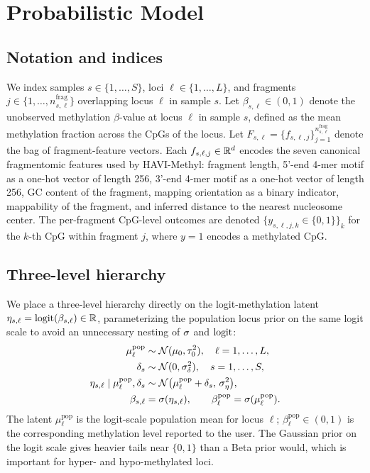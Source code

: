 \section{Probabilistic Model}
\label{sec:model}

\subsection{Notation and indices}
We index samples $s\in\{1,\dots,S\}$, loci $\ell\in\{1,\dots,L\}$, and fragments $j\in\{1,\dots,n^{\mathrm{frag}}_{s,\ell}\}$ overlapping locus $\ell$ in sample $s$. Let $\beta_{s,\ell}\in(0,1)$ denote the unobserved methylation $\beta$-value at locus $\ell$ in sample $s$, defined as the mean methylation fraction across the CpGs of the locus. Let $F_{s,\ell} = \{f_{s,\ell,j}\}_{j=1}^{n^{\mathrm{frag}}_{s,\ell}}$ denote the bag of fragment-feature vectors. Each $f_{s,\ell,j}\in\mathbb{R}^d$ encodes the seven canonical fragmentomic features used by HAVI-Methyl: fragment length, 5'-end 4-mer motif as a one-hot vector of length 256, 3'-end 4-mer motif as a one-hot vector of length 256, GC content of the fragment, mapping orientation as a binary indicator, mappability of the fragment, and inferred distance to the nearest nucleosome center. The per-fragment CpG-level outcomes are denoted $\{y_{s,\ell,j,k}\in\{0,1\}\}_k$ for the $k$-th CpG within fragment $j$, where $y=1$ encodes a methylated CpG.

\subsection{Three-level hierarchy}
We place a three-level hierarchy directly on the logit-methylation latent $\eta_{s,\ell}=\mathrm{logit}(\beta_{s,\ell})\in\mathbb{R}$, parameterizing the population locus prior on the same logit scale to avoid an unnecessary nesting of $\sigma$ and $\mathrm{logit}$:
\begin{align}
\mu^{\mathrm{pop}}_\ell &\sim \mathcal{N}(\mu_0, \tau_0^2), \quad \ell=1,\dots,L, \label{eq:pop}\\
\delta_s &\sim \mathcal{N}(0, \sigma_\delta^2), \quad s=1,\dots,S, \label{eq:samp}\\
\eta_{s,\ell}\mid \mu^{\mathrm{pop}}_\ell, \delta_s &\sim \mathcal{N}\big(\mu^{\mathrm{pop}}_\ell+\delta_s,\,\sigma_\eta^2\big),\label{eq:cell}\\
\beta_{s,\ell} &= \sigma(\eta_{s,\ell}),\qquad
\beta^{\mathrm{pop}}_\ell = \sigma(\mu^{\mathrm{pop}}_\ell).
\end{align}
The latent $\mu^{\mathrm{pop}}_\ell$ is the logit-scale population mean for locus $\ell$; $\beta^{\mathrm{pop}}_\ell\in(0,1)$ is the corresponding methylation level reported to the user. The Gaussian prior on the logit scale gives heavier tails near $\{0,1\}$ than a Beta prior would, which is important for hyper- and hypo-methylated loci.

